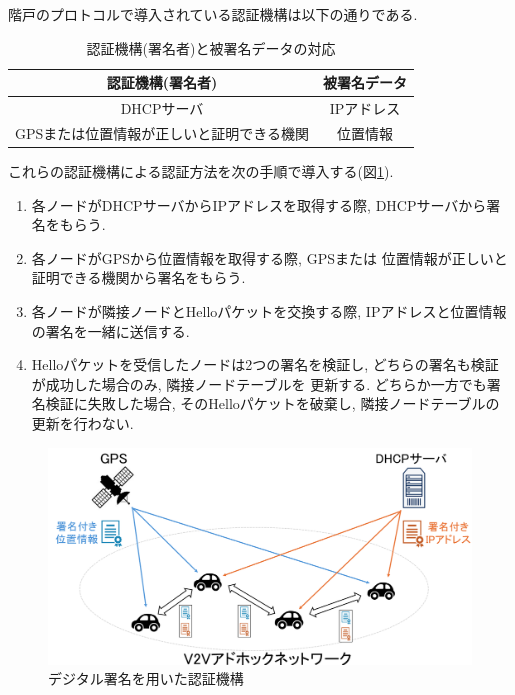 \indent 階戸のプロトコルで導入されている認証機構は以下の通りである.
\setlength{\tabcolsep}{30pt}
\begin{longtable}{cc}
  \caption{認証機構(署名者)と被署名データの対応}
  \endfirsthead
  \hline
  \multicolumn{1}{c}{認証機構(署名者)} & \multicolumn{1}{c}{被署名データ} \\ \hline \hline
  DHCPサーバ & IPアドレス \\
  GPSまたは位置情報が正しいと証明できる機関 & 位置情報 \\ \hline
\end{longtable}
\vspace{2em}
\indent これらの認証機構による認証方法を次の手順で導入する(図\ref{fig:introduce}).
\begin{enumerate}
  \item 各ノードがDHCPサーバからIPアドレスを取得する際, 
  DHCPサーバから署名をもらう.
  \item 各ノードがGPSから位置情報を取得する際, GPSまたは
  位置情報が正しいと証明できる機関から署名をもらう.
  \item 各ノードが隣接ノードとHelloパケットを交換する際, 
  IPアドレスと位置情報の署名を一緒に送信する. 
  \item Helloパケットを受信したノードは2つの署名を検証し, 
  どちらの署名も検証が成功した場合のみ, 隣接ノードテーブルを
  更新する. どちらか一方でも署名検証に失敗した場合, 
  そのHelloパケットを破棄し, 隣接ノードテーブルの更新を行わない.
\end{enumerate}

\begin{figure}[h]
  \centering
  \includegraphics[scale=0.8]{figures/introduce.png}
  \caption{デジタル署名を用いた認証機構\cite{shinato}}
  \label{fig:introduce}
\end{figure}
